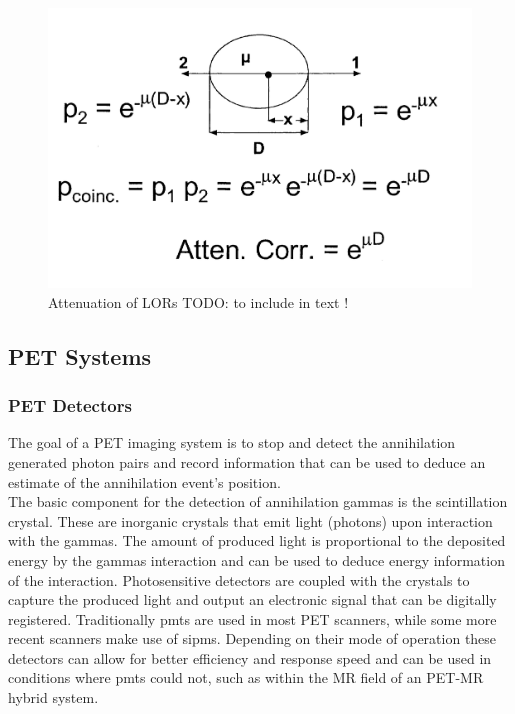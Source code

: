 \begin{figure} [h!]
\centering
\includegraphics[scale=0.45,angle=0]{2_Theory_Methods/figures/Phelps_LOR_attenuation_correction.png}
\caption{Attenuation of LORs TODO:  to include in text ! } 
\label{fig_2:511_interactions}
\end{figure} 

\subsection{PET Systems}

\subsubsection{PET Detectors}
The goal of a PET imaging system is to stop and detect the annihilation generated photon pairs and record information that can be used to deduce an estimate of the annihilation event's position.  \\
The basic component for the detection of annihilation gammas is the scintillation crystal. These are inorganic crystals that emit light (photons) upon interaction with the gammas. The amount of produced light is proportional to the deposited energy by the gammas interaction and can be used to deduce energy information of the interaction. Photosensitive detectors are coupled with the crystals to capture the produced light and output an electronic signal that can be digitally registered. Traditionally \glspl{pmt} are used in most PET scanners, while some more recent scanners make use of \glspl{sipm}. Depending on their mode of operation these detectors can allow for better efficiency and response speed and can be used in conditions where \glspl{pmt} could not, such as within the MR field of an PET-MR hybrid system.

